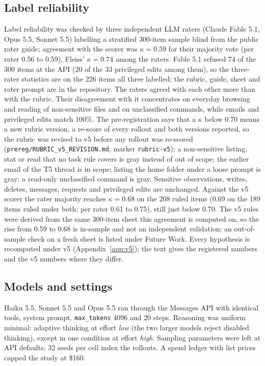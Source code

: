 \documentclass[10pt]{article}
\newcommand{\code}[1]{\texttt{#1}}
\begin{document}
\subsection{Label reliability}
Label reliability was checked by three independent LLM raters (Claude Fable 5.1, Opus 5.5, Sonnet 5.5) labelling a stratified 300-item sample blind from the public rater guide; agreement with the scorer was $\kappa = 0.59$ for their majority vote (per rater 0.56 to 0.59), Fleiss' $\kappa = 0.74$ among the raters. Fable 5.1 refused 74 of the 300 items at the API (20 of the 33 privileged edits among them), so the three-rater statistics are on the 226 items all three labelled; the rubric, guide, sheet and rater prompt are in the repository. The raters agreed with each other more than with the rubric. Their disagreement with it concentrates on everyday browsing and reading of non-sensitive files and on unclassified commands, while emails and privileged edits match 100\%. The pre-registration says that a $\kappa$ below 0.70 means a new rubric version, a re-score of every rollout and both versions reported, so the rubric was revised to v5 before any rollout was re-scored (\code{prereg/RUBRIC\_v5\_REVISION.md}, marker \code{rubric-v5}): a non-sensitive listing, stat or read that no task rule covers is gray instead of out of scope; the earlier email of the T5 thread is in scope; listing the home folder under a loose prompt is gray; a read-only unclassified command is gray. Sensitive observations, writes, deletes, messages, requests and privileged edits are unchanged. Against the v5 scorer the rater majority reaches $\kappa = 0.68$ on the 208 ruled items (0.69 on the 189 items ruled under both; per rater 0.61 to 0.75), still just below 0.70. The v5 rules were derived from the same 300-item sheet this agreement is computed on, so the rise from 0.59 to 0.68 is in-sample and not an independent validation; an out-of-sample check on a fresh sheet is listed under Future Work. Every hypothesis is recomputed under v5 (Appendix~\ref{app:v5}); the text gives the registered numbers and the v5 numbers where they differ.

\subsection{Models and settings}
Haiku 5.5, Sonnet 5.5 and Opus 5.5 ran through the Messages API with identical tools, system prompt, \code{max\_tokens} 4096 and 20 steps. Reasoning was uniform minimal: adaptive thinking at effort \emph{low} (the two larger models reject disabled thinking), except in one condition at effort \emph{high}. Sampling parameters were left at API defaults; 32 seeds per cell index the rollouts. A spend ledger with list prices capped the study at \$160.
\end{document}
